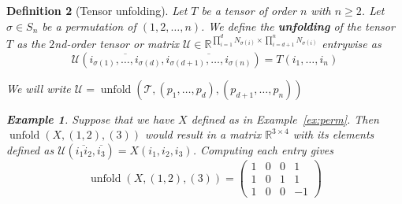 \documentclass[11pt,a4paper,openright,oneside]{book}
\numberwithin{equation}{section}
\newtheorem{defn0}{Definition}[chapter]
\newtheorem{example0}[defn0]{Example}
\newenvironment{definition}{ \begin{defn0}}{\end{defn0}}
\newenvironment{example}{ \begin{example0}\rm}{\end{example0}}
\newcommand{\exref}[1]{Example~\ref{#1}}
\DeclareMathOperator{\unfolding}{unfold}
\begin{document}
\begin{definition}[Tensor unfolding]
Let $T$ be a tensor of order $n$ with $n \geqslant 2$. Let $\sigma \in S_n$ be a permutation of $(1,2,\dots, n)$. We define the
\textbf{unfolding} of the tensor $T$ as the $2$nd-order tensor or matrix 
$\mathcal{U} \in \mathbb{R}^{\prod_{i=1}^d N_{\sigma(i)} \times \prod_{i=d+1}^n N_{\sigma(i)}}$ entrywise as
$$ \mathcal{U} (\overline{i_{\sigma(1)}, \dots, i_{\sigma(d)}}, \overline{i_{\sigma(d+1)}, \dots, i_{\sigma(n)}}) = T(i_1, \dots, i_n)$$

We will write $\mathcal{U} = \unfolding{(\mathcal{T}, (p_1, \dots, p_d), (p_{d+1}, \dots, p_n))}$ 

\begin{example}
    Suppose that we have $X$ defined as in \exref{ex:perm}.
        Then $\unfolding{(X, (1, 2), (3))}$ would result in a matrix $\mathbb{R}^{3 \times 4}$ with its elements defined as 
        $\mathcal{U}(\overline{i_1  i_2}, \overline{i_3}) = X(i_1, i_2, i_3)$. Computing each entry gives
        $$\unfolding{(X, (1, 2), (3))} = \begin{pmatrix}
            1 & 0 & 0 & 1 \\
            1 & 0 & 1 & 1 \\
            1 & 0 & 0 & -1
        \end{pmatrix}
        $$
    \label{exa:unfold}
\end{example}


\end{definition}
\end{document}
